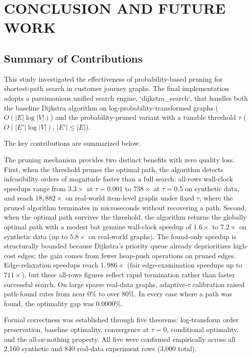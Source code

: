 \chapter{CONCLUSION AND FUTURE WORK}\label{chap:conclusion}

\section{Summary of Contributions}

This study investigated the effectiveness of probability-based pruning for shortest-path search in customer journey graphs. The final implementation adopts a parsimonious unified search engine, `dijkstra_search`, that handles both the baseline Dijkstra algorithm on log-probability-transformed graphs ($O(|E|\log|V|)$) and the probability-pruned variant with a tunable threshold $\tau$ ($O(|E'|\log|V|)$, $|E'|\leq|E|$).

The key contributions are summarized below.

The pruning mechanism provides two distinct benefits with zero quality loss. First, when the threshold prunes the optimal path, the algorithm detects infeasibility orders of magnitude faster than a full search: all-rows wall-clock speedups range from $3.3\times$ at $\tau=0.001$ to $738\times$ at $\tau=0.5$ on synthetic data, and reach $18{,}882\times$ on real-world item-level graphs under fixed $\tau$, where the pruned algorithm terminates in microseconds without recovering a path. Second, when the optimal path survives the threshold, the algorithm returns the globally optimal path with a modest but genuine wall-clock speedup of $1.6\times$ to $7.2\times$ on synthetic data (up to $5.8\times$ on real-world graphs). The found-only speedup is structurally bounded because Dijkstra's priority queue already deprioritizes high-cost edges; the gain comes from fewer heap-push operations on pruned edges. Edge-relaxation speedups reach $1{,}986\times$ (fair edge-examination speedups up to $711\times$), but these all-rows figures reflect rapid termination rather than faster successful search. On large sparse real-data graphs, adaptive-$\tau$ calibration raised path-found rates from near 0\% to over 80\%. In every case where a path was found, the optimality gap was $0.0000\%$.

Formal correctness was established through five theorems: log-transform order preservation, baseline optimality, convergence at $\tau=0$, conditional optimality, and the all-or-nothing property. All five were confirmed empirically across all 2,160 synthetic and 840 real-data experiment rows (3,000 total).

